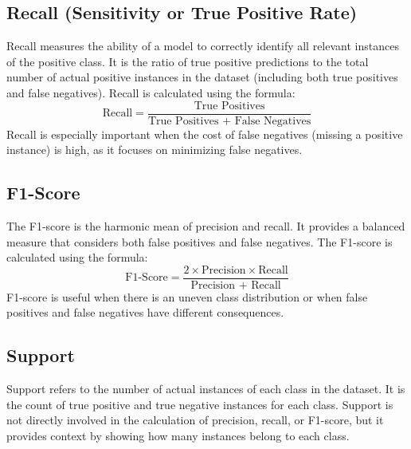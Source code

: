 \documentclass{article}
\begin{document}
\subsection{Recall (Sensitivity or True Positive Rate)}
Recall measures the ability of a model to correctly identify all relevant instances of the positive class. It is the ratio of true positive predictions to the total number of actual positive instances in the dataset (including both true positives and false negatives). Recall is calculated using the formula:
\[
\text{Recall} = \frac{\text{True Positives}}{\text{True Positives + False Negatives}}
\]
Recall is especially important when the cost of false negatives (missing a positive instance) is high, as it focuses on minimizing false negatives.

\subsection{F1-Score}
The F1-score is the harmonic mean of precision and recall. It provides a balanced measure that considers both false positives and false negatives. The F1-score is calculated using the formula:
\[
\text{F1-Score} = \frac{2 \times \text{Precision} \times \text{Recall}}{\text{Precision + Recall}}
\]
F1-score is useful when there is an uneven class distribution or when false positives and false negatives have different consequences.

\subsection{Support}
Support refers to the number of actual instances of each class in the dataset. It is the count of true positive and true negative instances for each class. Support is not directly involved in the calculation of precision, recall, or F1-score, but it provides context by showing how many instances belong to each class.
\end{document}
